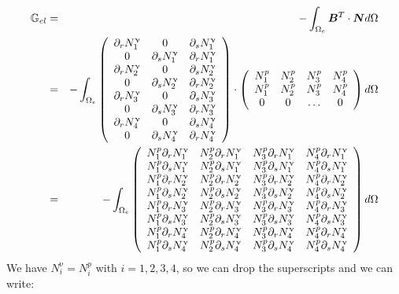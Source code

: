 \begin{eqnarray}
{\mathbb{G}}_{el} 
&=& -\int_{\Omega_e} {\bm B}^T \cdot {\bm N} d\Omega \\
&=& -\int_{\Omega_e}
\left(
\begin{array}{ccc}
\partial_r N_1^\upnu & 0 & \partial_s N_1^\upnu \\
0 & \partial_s N_1^\upnu & \partial_r N_1^\upnu \\
\partial_r N_2^\upnu & 0 & \partial_s N_2^\upnu \\
0 & \partial_s N_2^\upnu & \partial_r N_2^\upnu \\
\partial_r N_3^\upnu & 0 & \partial_s N_3^\upnu \\
0 & \partial_s N_3^\upnu & \partial_r N_3^\upnu \\
\partial_r N_4^\upnu & 0 & \partial_s N_4^\upnu \\
0 & \partial_s N_4^\upnu & \partial_r N_4^\upnu \\
\end{array}
\right)
\cdot
\left(
\begin{array}{cccc}
N_1^p & N_2^p & N_3^p & N_{4}^p \\ 
N_1^p & N_2^p & N_3^p & N_{4}^p \\ 
0 & 0 & \dots & 0
\end{array}
\right)
d\Omega \\
&=&
-\int_{\Omega_e}
\left(
\begin{array}{cccc}
N_1^p\partial_r N_1^\upnu & N_2^p\partial_r N_1^\upnu & N_3^p\partial_r N_1^\upnu & N_4^p\partial_r N_1^\upnu \\
N_1^p\partial_s N_1^\upnu & N_2^p\partial_s N_1^\upnu & N_3^p\partial_s N_1^\upnu & N_4^p\partial_s N_1^\upnu \\
N_1^p\partial_r N_2^\upnu & N_2^p\partial_r N_2^\upnu & N_3^p\partial_r N_2^\upnu & N_4^p\partial_r N_2^\upnu \\
N_1^p\partial_s N_2^\upnu & N_2^p\partial_s N_2^\upnu & N_3^p\partial_s N_2^\upnu & N_4^p\partial_s N_2^\upnu \\
N_1^p\partial_r N_3^\upnu & N_2^p\partial_r N_3^\upnu & N_3^p\partial_r N_3^\upnu & N_4^p\partial_r N_3^\upnu \\
N_1^p\partial_s N_3^\upnu & N_2^p\partial_s N_3^\upnu & N_3^p\partial_s N_3^\upnu & N_4^p\partial_s N_3^\upnu \\
N_1^p\partial_r N_4^\upnu & N_2^p\partial_r N_4^\upnu & N_3^p\partial_r N_4^\upnu & N_4^p\partial_r N_4^\upnu \\
N_1^p\partial_s N_4^\upnu & N_2^p\partial_s N_4^\upnu & N_3^p\partial_s N_4^\upnu & N_4^p\partial_s N_4^\upnu 
\end{array}
\right)
d\Omega \\
\end{eqnarray}
We have $N_i^\upnu = N_i^p $ with $i=1,2,3,4$, so we can drop the superscripts and we can write:

